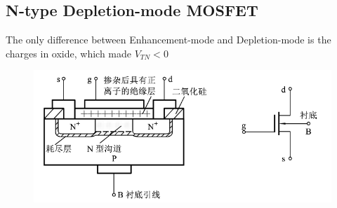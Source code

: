 \subsection{N-type Depletion-mode MOSFET}

The only difference between Enhancement-mode and Depletion-mode is the charges in oxide, which made $V_{TN} < 0$

\begin{figure}[H]
  \centering
  \includegraphics[width=0.75\linewidth]{figures/DNMOS}
\end{figure}

